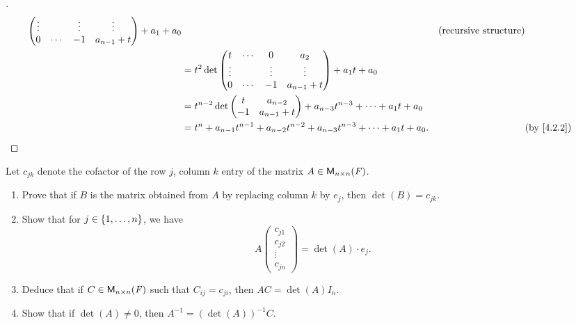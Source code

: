 \begin{proof}[]
\begin{align*}
{\begin{pmatrix}
				                 \vdots &        & \vdots & \vdots        \\
				                 0      & \cdots & -1     & a_{n - 1} + t
			                 \end{pmatrix} + a_1} + a_0                                                     &  & \text{(recursive structure)} \\
		 & = t^2 \det\begin{pmatrix}
			             t      & \cdots & 0      & a_2           \\
			             \vdots &        & \vdots & \vdots        \\
			             0      & \cdots & -1     & a_{n - 1} + t
		             \end{pmatrix} + a_1 t + a_0                                                                             \\
		 & = t^{n - 2} \det\begin{pmatrix}
			                   t  & a_{n - 2}     \\
			                   -1 & a_{n - 1} + t
		                   \end{pmatrix} + a_{n - 3} t^{n - 3} + \cdots + a_1 t + a_0                                                     \\
		 & = t^n + a_{n - 1} t^{n - 1} + a_{n - 2} t^{n - 2} + a_{n - 3} t^{n - 3} + \cdots + a_1 t + a_0. &  & \by{4.2.2}
	\end{align*}
\end{proof}

\begin{ex}\label{ex:4.3.25}
	Let \(c_{j k}\) denote the cofactor of the row \(j\), column \(k\) entry of the matrix \(A \in \mathsf{M}_{{n} \times n}({\mathit{F}})\).
	\begin{enumerate}
		\item Prove that if \(B\) is the matrix obtained from \(A\) by replacing column \(k\) by \(e_j\), then \(\det(B) = c_{j k}\).
		\item Show that for \(j \in \left\lbrace1, \dots, n\right\rbrace\), we have
		      \[
			      A \begin{pmatrix}
				      c_{j 1} \\
				      c_{j 2} \\
				      \vdots  \\
				      c_{j n}
			      \end{pmatrix} = \det(A) \cdot e_j.
		      \]
		\item Deduce that if \(C \in \mathsf{M}_{{n} \times n}({\mathit{F}})\) such that \(C_{i j} = c_{j i}\), then \(AC = \det(A) I_n\).
		\item Show that if \(\det(A) \neq 0\), then \(A^{-1} = (\det(A))^{-1} C\).
	\end{enumerate}
\end{ex}

